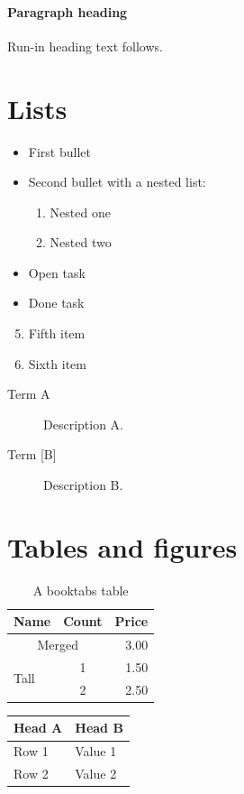 \documentclass[12pt,a4paper]{article}
\begin{document}
\paragraph{Paragraph heading} Run-in heading text follows.

\section{Lists}
\begin{itemize}
  \item First bullet
  \item Second bullet with a nested list:
  \begin{enumerate}
    \item Nested one
    \item Nested two
  \end{enumerate}
  \item[$\square$] Open task
  \item[$\boxtimes$] Done task
\end{itemize}

\begin{enumerate}
  \setcounter{enumi}{4}
  \item Fifth item
  \item Sixth item
\end{enumerate}

\begin{description}
  \item[Term A] Description A.
  \item[{Term [B]}] Description B.
\end{description}

\section{Tables and figures}
\begin{table}[htbp]
  \centering
  \caption{A booktabs table}\label{tab:main}
  \begin{tabular}{l c r}
    \toprule
    Name & Count & Price \\
    \midrule
    \multicolumn{2}{c}{Merged} & 3.00 \\
    \multirow{2}{*}{Tall} & 1 & 1.50 \\
     & 2 & \cellcolor{yellow}2.50 \\
    \bottomrule
  \end{tabular}
\end{table}

\begin{longtable}{|p{3cm}|p{3cm}|}
\hline
Head A & Head B \\
\hline
\endhead
Row 1 & Value 1 \\
Row 2 & Value 2 \\
\hline
\end{longtable}
\end{document}
